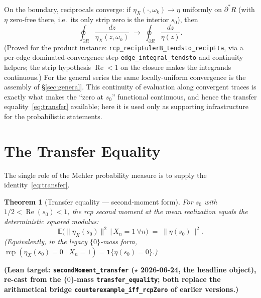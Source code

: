 \documentclass[11pt,a4paper]{article}
\newtheorem{theorem}{Theorem}[section]
\theoremstyle{definition}
\newcommand{\Rea}{\operatorname{Re}}
\newcommand{\etaX}{\eta_X}
\newcommand{\rcp}{\operatorname{rcp}}
\begin{document}
On the boundary, reciprocals converge: if \(\etaX(\cdot,\omega_k)\to\eta\) uniformly on
\(\partial^\ast R\) (with \(\eta\) zero-free there, i.e.\ its only strip zero is the
interior \(s_0\)), then
\[
  \oint_{\partial R}\frac{dz}{\etaX(z,\omega_k)}
  \;\longrightarrow\;
  \oint_{\partial R}\frac{dz}{\eta(z)} .
\]
(Proved for the product instance: \texttt{rcp\_recipEulerB\_tendsto\_recipEta}, via a
per-edge dominated-convergence step \texttt{edge\_integral\_tendsto} and continuity
helpers; the strip hypothesis \(\Rea<1\) on the closure makes the integrands continuous.)
For the general series the same locally-uniform convergence is the assembly of
\S\ref{sec:general}. This continuity of evaluation along convergent traces is exactly what
makes the ``zero at \(s_0\)'' functional continuous, and hence the transfer
equality~\eqref{eq:transfer} available; here it is used only as supporting infrastructure
for the probabilistic statements.

\section{The Transfer Equality}\label{sec:transfer}

The single role of the Mehler probability measure is to supply the identity~\eqref{eq:transfer}.

\begin{theorem}[Transfer equality --- second-moment form]\label{thm:transfer}
For \(s_0\) with \(1/2<\Rea(s_0)<1\), the rcp \emph{second moment} at the mean realization equals the
deterministic squared modulus:
\[
  \mathbb{E}\bigl(\|\etaX(s_0)\|^2 \,\big|\, X_n=1\ \forall n\bigr) \;=\; \|\eta(s_0)\|^2 .
\]
(Equivalently, in the legacy \(\{0\}\)-mass form,
\(\rcp(\etaX(s_0)=0\mid X_n=1)=\mathbf{1}\{\eta(s_0)=0\}\).)
\end{theorem}
\textbf{(Lean target: \texttt{secondMoment\_transfer} (\(\star\) 2026-06-24, the headline object),
re-cast from the \(\{0\}\)-mass \texttt{transfer\_equality}; both replace the arithmetical bridge
\texttt{counterexample\_iff\_rcpZero} of earlier versions.)}
\end{document}
